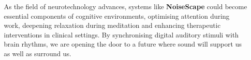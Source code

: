 As the field of neurotechnology advances, systems like \textbf{NoiseScape} could become essential components of cognitive environments, optimising attention during work, deepening relaxation during meditation and enhancing therapeutic interventions in clinical settings. By synchronising digital auditory stimuli with brain rhythms, we are opening the door to a future where sound will support us as well as surround us.


